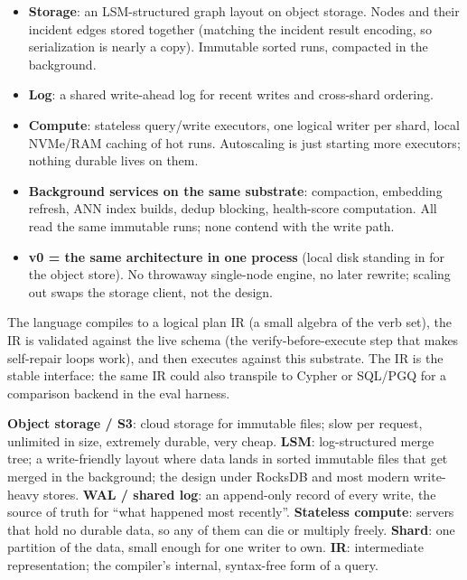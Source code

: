\documentclass[11pt]{article}
\begin{document}
\begin{itemize}[leftmargin=1.4em,itemsep=2pt]
  \item \textbf{Storage}: an LSM-structured graph layout on object storage. Nodes and their incident edges stored together (matching the incident result encoding, so serialization is nearly a copy). Immutable sorted runs, compacted in the background.
  \item \textbf{Log}: a shared write-ahead log for recent writes and cross-shard ordering.
  \item \textbf{Compute}: stateless query/write executors, one logical writer per shard, local NVMe/RAM caching of hot runs. Autoscaling is just starting more executors; nothing durable lives on them.
  \item \textbf{Background services on the same substrate}: compaction, embedding refresh, ANN index builds, dedup blocking, health-score computation. All read the same immutable runs; none contend with the write path.
  \item \textbf{v0 = the same architecture in one process} (local disk standing in for the object store). No throwaway single-node engine, no later rewrite; scaling out swaps the storage client, not the design.
\end{itemize}

The language compiles to a logical plan IR (a small algebra of the verb set), the IR is validated against the live schema (the verify-before-execute step that makes self-repair loops work), and then executes against this substrate. The IR is the stable interface: the same IR could also transpile to Cypher or SQL/PGQ for a comparison backend in the eval harness.

\begin{glossbox}
\textbf{Object storage / S3}: cloud storage for immutable files; slow per request, unlimited in size, extremely durable, very cheap. \textbf{LSM}: log-structured merge tree; a write-friendly layout where data lands in sorted immutable files that get merged in the background; the design under RocksDB and most modern write-heavy stores. \textbf{WAL / shared log}: an append-only record of every write, the source of truth for ``what happened most recently''. \textbf{Stateless compute}: servers that hold no durable data, so any of them can die or multiply freely. \textbf{Shard}: one partition of the data, small enough for one writer to own. \textbf{IR}: intermediate representation; the compiler's internal, syntax-free form of a query.
\end{glossbox}
\end{document}
